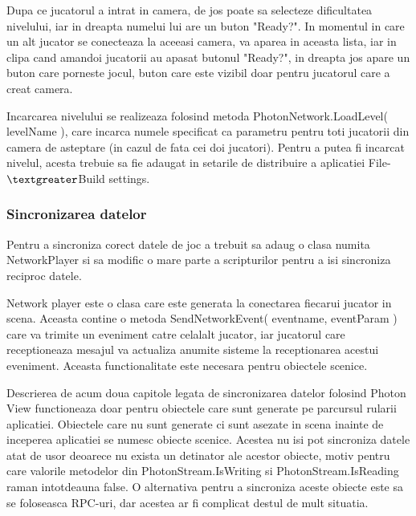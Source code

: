 \documentclass[12pt, a4paper]{article}
\begin{document}
	Dupa ce jucatorul a intrat in camera, de jos poate sa selecteze dificultatea nivelului, iar in dreapta numelui lui are un buton "Ready?". In momentul in care un alt jucator se conecteaza la aceeasi camera, va aparea in aceasta lista, iar in clipa cand amandoi jucatorii au apasat butonul "Ready?", in dreapta jos apare un buton care porneste jocul, buton care este vizibil doar pentru jucatorul care a creat camera.
	\newline
	
	Incarcarea nivelului se realizeaza folosind metoda PhotonNetwork.LoadLevel( levelName ), care incarca numele specificat ca parametru pentru toti jucatorii din camera de asteptare (in cazul de fata cei doi jucatori). Pentru a putea fi incarcat nivelul, acesta trebuie sa fie adaugat in setarile de distribuire a aplicatiei File-$\textgreater$Build settings.
	
	
	
	
	
	\subsubsection{Sincronizarea datelor}
	\label{section: dataSync}
	
	Pentru a sincroniza corect datele de joc a trebuit sa adaug o clasa numita NetworkPlayer si sa modific o mare parte a scripturilor pentru a isi sincroniza reciproc datele.
	\newline
	
	Network player este o clasa care este generata la conectarea fiecarui jucator in scena. Aceasta contine o metoda SendNetworkEvent( eventname, eventParam ) care va trimite un eveniment catre celalalt jucator, iar jucatorul care receptioneaza mesajul va actualiza anumite sisteme la receptionarea acestui eveniment. Aceasta functionalitate este necesara pentru obiectele scenice.
	\newline
	
	Descrierea de acum doua capitole legata de sincronizarea datelor folosind Photon View functioneaza doar pentru obiectele care sunt generate pe parcursul rularii aplicatiei. Obiectele care nu sunt generate ci sunt asezate in scena inainte de inceperea aplicatiei se numesc obiecte scenice. Acestea nu isi pot sincroniza datele atat de usor deoarece nu exista un detinator ale acestor obiecte, motiv pentru care valorile metodelor din PhotonStream.IsWriting si PhotonStream.IsReading raman intotdeauna false. O alternativa pentru a sincroniza aceste obiecte este sa se foloseasca RPC-uri, dar acestea ar fi complicat destul de mult situatia.
	\newline
	
\end{document}
